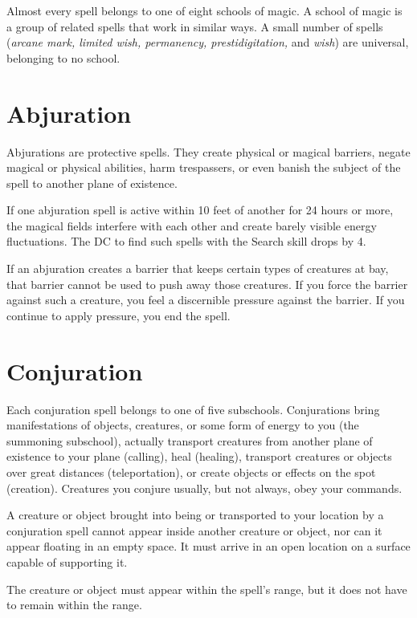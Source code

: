 \documentclass{article}
\begin{document}
Almost every spell belongs to one of eight schools of magic. A school of magic 
is a group of related spells that work in similar ways. A small number of spells 
(\textit{arcane mark, limited wish, permanency, prestidigitation, }and \textit{wish}) 
are universal, belonging to no school.

\vspace{12pt}
\section*{\textbf{Abjuration}}

Abjurations are protective spells. They create physical or magical barriers, negate 
magical or physical abilities, harm trespassers, or even banish the subject of 
the spell to another plane of existence. 

If one abjuration spell is active within 10 feet of another for 24 hours or more, 
the magical fields interfere with each other and create barely visible energy fluctuations. 
The DC to find such spells with the Search skill drops by 4.

If an abjuration creates a barrier that keeps certain types of creatures at bay, 
that barrier cannot be used to push away those creatures. If you force the barrier 
against such a creature, you feel a discernible pressure against the barrier. If 
you continue to apply pressure, you end the spell.

\vspace{12pt}
\section*{\textbf{Conjuration}}

Each conjuration spell belongs to one of five subschools. Conjurations bring manifestations 
of objects, creatures, or some form of energy to you (the summoning subschool), 
actually transport creatures from another plane of existence to your plane (calling), 
heal (healing), transport creatures or objects over great distances (teleportation), 
or create objects or effects on the spot (creation). Creatures you conjure usually, 
but not always, obey your commands.

A creature or object brought into being or transported to your location by a conjuration 
spell cannot appear inside another creature or object, nor can it appear floating 
in an empty space. It must arrive in an open location on a surface capable of supporting 
it.

The creature or object must appear within the spell's range, but it does not have 
to remain within the range.
\end{document}
